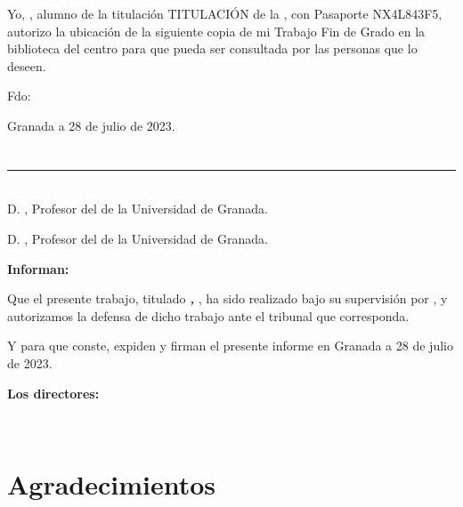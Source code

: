 Yo, \textbf{\myName}, alumno de la titulación TITULACIÓN de la \textbf{\myFaculty}, 
con Pasaporte NX4L843F5, autorizo la ubicación de la siguiente copia de mi 
Trabajo Fin de Grado en la biblioteca del centro para que pueda ser
consultada por las personas que lo deseen.

\vspace{6cm}

\noindent Fdo: \myName

\vspace{2cm}

\begin{flushright}
Granada a 28 de julio de 2023.
\end{flushright}


\chapter*{}
\thispagestyle{empty}

\noindent\rule[-1ex]{\textwidth}{2pt}\\[4.5ex]

D. \textbf{\myProf}, Profesor del \myDepartment de la Universidad de Granada.

\vspace{0.5cm}

D. \textbf{\myOtherProf}, Profesor del \myDepartment de la Universidad de Granada.


\vspace{0.5cm}

\textbf{Informan:}

\vspace{0.5cm}

Que el presente trabajo, titulado \textit{\textbf{\myTitle, \mySubTitle}},
ha sido realizado bajo su supervisión por \textbf{\myName}, y autorizamos la defensa de dicho trabajo ante el tribunal
que corresponda.

\vspace{0.5cm}

Y para que conste, expiden y firman el presente informe en Granada a 28 de julio de 2023.

\vspace{1cm}

\textbf{Los directores:}

\vspace{5cm}

\noindent \textbf{\myProf \ \ \ \ \ \myOtherProf}

\chapter*{Agradecimientos}

